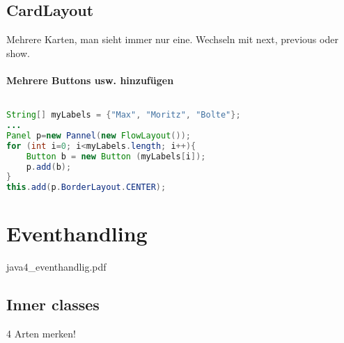 \subsection{CardLayout}
Mehrere Karten, man sieht immer nur eine. Wechseln mit next, previous oder show.

\paragraph{Mehrere Buttons usw. hinzufügen} $ $
\begin{lstlisting}[language=Java]
String[] myLabels = {"Max", "Moritz", "Bolte"};
...
Panel p=new Pannel(new FlowLayout());
for (int i=0; i<myLabels.length; i++){
	Button b = new Button (myLabels[i]);
	p.add(b);
}
this.add(p.BorderLayout.CENTER);
\end{lstlisting}

\section{Eventhandling}
java4\_eventhandlig.pdf

\subsection{Inner classes}
4 Arten merken!


\newpage
\printbibliography
